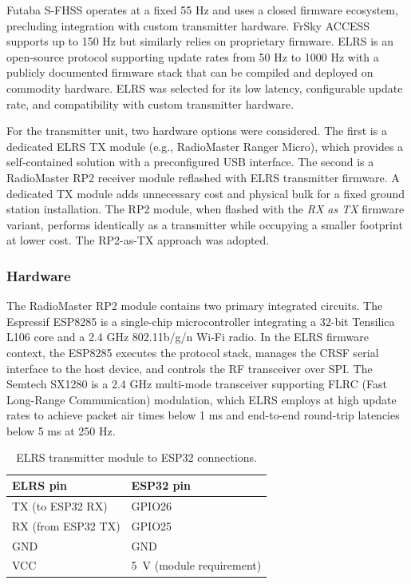 Futaba S-FHSS operates at a fixed 55 Hz and uses a closed firmware ecosystem, precluding
integration with custom transmitter hardware.
FrSky ACCESS supports up to 150 Hz but similarly relies on proprietary firmware.
ELRS is an open-source protocol supporting update rates from 50 Hz to 1000 Hz with a publicly
documented firmware stack that can be compiled and deployed on commodity hardware.
ELRS was selected for its low latency, configurable update rate, and compatibility with custom
transmitter hardware.

For the transmitter unit, two hardware options were considered.
The first is a dedicated ELRS TX module (e.g., RadioMaster Ranger Micro), which provides a
self-contained solution with a preconfigured USB interface.
The second is a RadioMaster RP2 receiver module reflashed with ELRS transmitter firmware.
A dedicated TX module adds unnecessary cost and physical bulk for a fixed ground station
installation.
The RP2 module, when flashed with the \emph{RX as TX} firmware variant, performs identically as a
transmitter while occupying a smaller footprint at lower cost.
The RP2-as-TX approach was adopted.

\subsubsection{Hardware}

The RadioMaster RP2 module contains two primary integrated circuits.
The Espressif ESP8285 is a single-chip microcontroller integrating a 32-bit Tensilica L106 core
and a 2.4 GHz 802.11b/g/n Wi-Fi radio.
In the ELRS firmware context, the ESP8285 executes the protocol stack, manages the CRSF
serial interface to the host device, and controls the RF transceiver over SPI.
The Semtech SX1280 is a 2.4 GHz multi-mode transceiver supporting FLRC (Fast Long-Range
Communication) modulation, which ELRS employs at high update rates to achieve packet air times
below 1 ms and end-to-end round-trip latencies below 5 ms at 250 Hz.

\begin{table}[htb!]
    \centering
    \caption{ELRS transmitter module to ESP32 connections.}
    \label{tab:elrs-hw}
    \begin{tabularx}{\linewidth}{l l}
        \hline
        \textbf{ELRS pin} & \textbf{ESP32 pin} \\
        \hline
        TX (to ESP32 RX) & GPIO26 \\
        RX (from ESP32 TX) & GPIO25 \\
        GND & GND \\
        VCC & 5~V (module requirement) \\
        \hline
    \end{tabularx}
\end{table}

